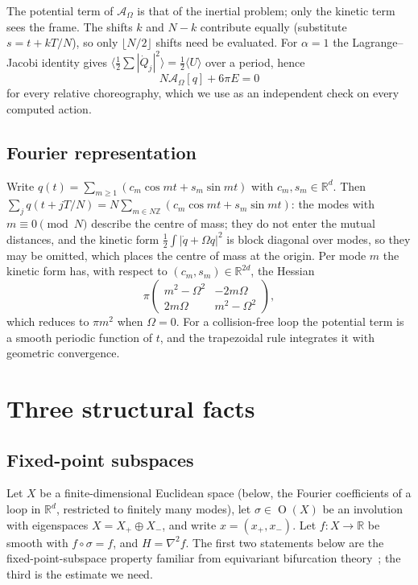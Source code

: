 \documentclass[11pt]{amsart}
\theoremstyle{definition}
\newcommand{\R}{\mathbb{R}}
\newcommand{\Z}{\mathbb{Z}}
\newcommand{\act}{\mathcal{A}}
\DeclareMathOperator{\Orth}{O}
\begin{document}
The potential term of $\act_\Omega$ is that of the inertial problem; only the kinetic term sees the frame. The shifts $k$ and $N-k$ contribute equally (substitute $s=t+kT/N$), so only $\lfloor N/2\rfloor$ shifts need be evaluated. For $\alpha=1$ the Lagrange--Jacobi identity gives $\langle\tfrac12\sum|\dot Q_j|^2\rangle=\tfrac12\langle U\rangle$ over a period, hence
\begin{equation}\label{eq:virial}
N\act_\Omega[q]+6\pi E=0
\end{equation}
for every relative choreography, which we use as an independent check on every computed action.

\subsection{Fourier representation}
Write $q(t)=\sum_{m\ge1}(c_m\cos mt+s_m\sin mt)$ with $c_m,s_m\in\R^d$. Then $\sum_jq(t+jT/N)=N\sum_{m\in N\Z}(c_m\cos mt+s_m\sin mt)$: the modes with $m\equiv0\pmod N$ describe the centre of mass; they do not enter the mutual distances, and the kinetic form $\frac12\int|\dot q+\Omega q|^2$ is block diagonal over modes, so they may be omitted, which places the centre of mass at the origin. Per mode $m$ the kinetic form has, with respect to $(c_m,s_m)\in\R^{2d}$, the Hessian
\begin{equation}\label{eq:kinblock}
\pi\begin{pmatrix} m^2-\Omega^2 & -2m\Omega\\ 2m\Omega & m^2-\Omega^2\end{pmatrix},
\end{equation}
which reduces to $\pi m^2$ when $\Omega=0$. For a collision-free loop the potential term is a smooth periodic function of $t$, and the trapezoidal rule integrates it with geometric convergence.

\section{Three structural facts}\label{sec:structure}

\subsection{Fixed-point subspaces}
Let $X$ be a finite-dimensional Euclidean space (below, the Fourier coefficients of a loop in $\R^d$, restricted to finitely many modes), let $\sigma\in\Orth(X)$ be an involution with eigenspaces $X=X_+\oplus X_-$, and write $x=(x_+,x_-)$. Let $f\colon X\to\R$ be smooth with $f\circ\sigma=f$, and $H=\nabla^2f$. The first two statements below are the fixed-point-subspace property familiar from equivariant bifurcation theory~\cite{GSS1988}; the third is the estimate we need.
\end{document}
